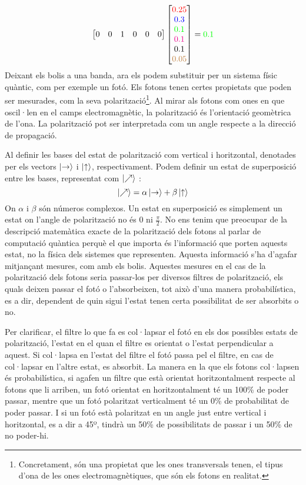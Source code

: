 $$
\begin{bmatrix}
	0 & 0 & 1 & 0 & 0 & 0\\
\end{bmatrix}
\begin{bmatrix}
	\textcolor{red}{0.25} \\
	\textcolor{blue}{0.3 }\\
	\textcolor{green}{0.1 }\\
	\textcolor{magenta}{0.1 }\\
	\textcolor{black}{0.1 }\\
	\textcolor{brown}{0.05}
\end{bmatrix} = \textcolor{green}{0.1 }
$$
Deixant els bolis a una banda, ara els podem substituir per un sistema físic quàntic, com per exemple un fotó. Els fotons tenen certes propietats que poden ser mesurades, com la seva polarització\footnote{Concretament, són una propietat que les ones transversals tenen, el tipus d'ona de les ones electromagnètiques, que són els fotons en realitat.}. Al mirar als fotons com ones en que oscil·len en el camps electromagnètic, la polarització és l'orientació geomètrica de l'ona. La polarització pot ser interpretada com un angle respecte a la direcció de propagació. 

Al definir les bases del estat de polarització com vertical i horitzontal, denotades per els vectors $\ket{\text{\textrightarrow}}$ i $\ket{\text{\textuparrow}}$, respectivament. Podem definir un estat de superposició entre les bases, representat com $\ket{\nearrow}$ \cite{QC_intro:photon}: 
$$
\ket{\nearrow} = \alpha\ket{\text{\textrightarrow}} + \beta\ket{\text{\textuparrow}}
$$
On $\alpha$ i $\beta$ són números complexos. 
Un estat en superposició es simplement un estat on l'angle de polarització no és $0$ ni $\frac{\pi}{2}$. No ens tenim que preocupar de la descripció matemàtica exacte de la polarització dels fotons al parlar de computació quàntica perquè el que importa és l'informació que porten aquests estat, no la física dels sistemes que representen. Aquesta informació s'ha d'agafar mitjançant mesures, com amb els bolis. Aquestes mesures en el cas de la polarització dels fotons seria passar-los per diversos filtres de polarització, els quals deixen passar el fotó o l'absorbeixen, tot això d'una manera probabilística, es a dir, dependent de quin sigui l'estat tenen certa possibilitat de ser absorbits o no.

Per clarificar, el filtre lo que fa es col·lapsar el fotó en els dos possibles estats de polarització, l'estat en el quan el filtre es orientat o l'estat perpendicular a aquest. Si col·lapsa en l'estat del filtre el fotó passa pel el filtre, en cas de col·lapsar en l'altre estat, es absorbit. La manera en la que els fotons col·lapsen és probabilística, si agafen un filtre que està orientat horitzontalment respecte al fotons que li arriben, un fotó orientat en horitzontalment té un 100\% de poder passar, mentre que un fotó polaritzat verticalment té un 0\% de probabilitat de poder passar. I si un fotó està polaritzat en un angle just entre vertical i horitzontal, es a dir a 45º, tindrà un 50\% de possibilitats de passar i un 50\% de no poder-hi. 

